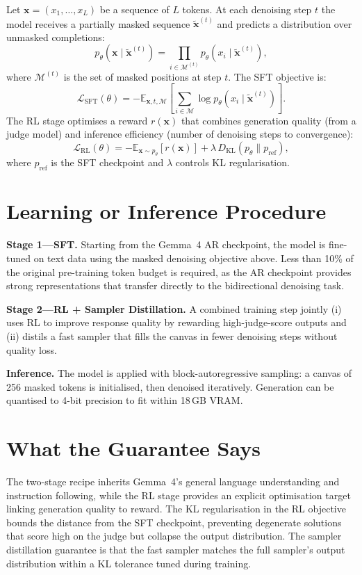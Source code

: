 \documentclass[10pt,twocolumn]{article}
\begin{document}
Let $\mathbf{x} = (x_1, \ldots, x_L)$ be a sequence of $L$ tokens.
At each denoising step $t$ the model receives a partially masked sequence
$\tilde{\mathbf{x}}^{(t)}$ and predicts a distribution over unmasked completions:
\[
p_\theta\!\left(\mathbf{x} \mid \tilde{\mathbf{x}}^{(t)}\right)
= \prod_{i \in \mathcal{M}^{(t)}} p_\theta\!\left(x_i \mid \tilde{\mathbf{x}}^{(t)}\right),
\]
where $\mathcal{M}^{(t)}$ is the set of masked positions at step $t$.
The SFT objective is:
\[
\mathcal{L}_{\mathrm{SFT}}(\theta) =
-\mathbb{E}_{\mathbf{x}, t, \mathcal{M}}\!\left[
  \sum_{i\in\mathcal{M}} \log p_\theta(x_i \mid \tilde{\mathbf{x}}^{(t)})
\right].
\]
The RL stage optimises a reward $r(\mathbf{x})$ that combines generation quality
(from a judge model) and inference efficiency (number of denoising steps to convergence):
\[
\mathcal{L}_{\mathrm{RL}}(\theta) =
-\mathbb{E}_{\mathbf{x}\sim p_\theta}\!\left[r(\mathbf{x})\right]
+ \lambda\,D_{\mathrm{KL}}(p_\theta \| p_{\mathrm{ref}}),
\]
where $p_{\mathrm{ref}}$ is the SFT checkpoint and $\lambda$ controls KL regularisation.

\section{Learning or Inference Procedure}

\textbf{Stage 1---SFT.}
Starting from the Gemma~4 AR checkpoint, the model is fine-tuned on text data using
the masked denoising objective above. Less than 10\% of the original pre-training
token budget is required, as the AR checkpoint provides strong representations that
transfer directly to the bidirectional denoising task.

\textbf{Stage 2---RL + Sampler Distillation.}
A combined training step jointly (i) uses RL to improve response quality by rewarding
high-judge-score outputs and (ii) distils a fast sampler that fills the canvas in
fewer denoising steps without quality loss.

\textbf{Inference.}
The model is applied with block-autoregressive sampling: a canvas of 256 masked tokens
is initialised, then denoised iteratively. Generation can be quantised to 4-bit
precision to fit within 18\,GB VRAM.

\section{What the Guarantee Says}

The two-stage recipe inherits Gemma~4's general language understanding and instruction
following, while the RL stage provides an explicit optimisation target linking generation
quality to reward. The KL regularisation in the RL objective bounds the distance from the
SFT checkpoint, preventing degenerate solutions that score high on the judge but collapse
the output distribution. The sampler distillation guarantee is that the fast sampler matches
the full sampler's output distribution within a KL tolerance tuned during training.
\end{document}
